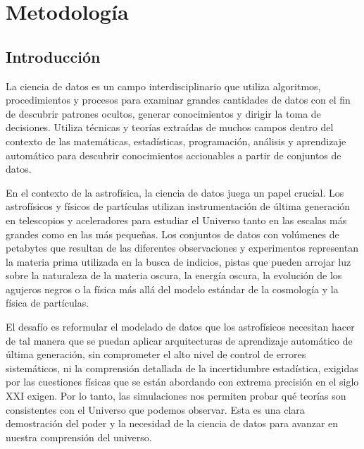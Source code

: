 
\chapter{Metodología}\label{ch:octavo-capitulo}
\section{Introducción}
La ciencia de datos es un campo interdisciplinario que utiliza algoritmos, procedimientos y procesos para examinar grandes cantidades de datos con el fin de descubrir patrones ocultos, generar conocimientos y dirigir la toma de decisiones. Utiliza técnicas y teorías extraídas de muchos campos dentro del contexto de las matemáticas, estadísticas, programación, análisis y aprendizaje automático para descubrir conocimientos accionables a partir de conjuntos de datos.\par

En el contexto de la astrofísica, la ciencia de datos juega un papel crucial. Los astrofísicos y físicos de partículas utilizan instrumentación de última generación en telescopios y aceleradores para estudiar el Universo tanto en las escalas más grandes como en las más pequeñas. Los conjuntos de datos con volúmenes de petabytes que resultan de las diferentes observaciones y experimentos representan la materia prima utilizada en la busca de indicios, pistas que pueden arrojar luz sobre la naturaleza de la materia oscura, la energía oscura, la evolución de los agujeros negros o la física más allá del modelo estándar de la cosmología y la física de partículas.\par

El desafío es reformular el modelado de datos que los astrofísicos necesitan hacer de tal manera que se puedan aplicar arquitecturas de aprendizaje automático de última generación, sin comprometer el alto nivel de control de errores sistemáticos, ni la comprensión detallada de la incertidumbre estadística, exigidas por las cuestiones físicas que se están abordando con extrema precisión en el siglo XXI exigen. Por lo tanto, las simulaciones nos permiten probar qué teorías son consistentes con el Universo que podemos observar. Esta es una clara demostración del poder y la necesidad de la ciencia de datos para avanzar en nuestra comprensión del universo.\par


